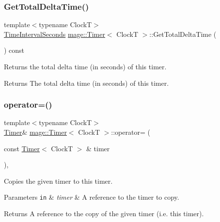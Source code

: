 \subsubsection{\texorpdfstring{Get\+Total\+Delta\+Time()}{GetTotalDeltaTime()}}
{\footnotesize\ttfamily template$<$typename ClockT$>$ \\
\mbox{\hyperlink{namespacemage_a21c3d1575018d1e0720948713c76be1f}{Time\+Interval\+Seconds}} \mbox{\hyperlink{classmage_1_1_timer}{mage\+::\+Timer}}$<$ ClockT $>$\+::Get\+Total\+Delta\+Time (\begin{DoxyParamCaption}{ }\end{DoxyParamCaption}) const\hspace{0.3cm}{\ttfamily [noexcept]}}

Returns the total delta time (in seconds) of this timer.

\begin{DoxyReturn}{Returns}
The total delta time (in seconds) of this timer. 
\end{DoxyReturn}
\mbox{\label{classmage_1_1_timer_a2a8aefb272e02d8ba4a26058df80f119}} 
\subsubsection{\texorpdfstring{operator=()}{operator=()}\hspace{0.1cm}{\footnotesize\ttfamily [1/2]}}
{\footnotesize\ttfamily template$<$typename ClockT$>$ \\
\mbox{\hyperlink{classmage_1_1_timer}{Timer}}\& \mbox{\hyperlink{classmage_1_1_timer}{mage\+::\+Timer}}$<$ ClockT $>$\+::operator= (\begin{DoxyParamCaption}\item[{const \mbox{\hyperlink{classmage_1_1_timer}{Timer}}$<$ ClockT $>$ \&}]{timer }\end{DoxyParamCaption})\hspace{0.3cm}{\ttfamily [default]}, {\ttfamily [noexcept]}}

Copies the given timer to this timer.


\begin{DoxyParams}[1]{Parameters}
\mbox{\tt in}  & {\em timer} & A reference to the timer to copy. \\
\hline
\end{DoxyParams}
\begin{DoxyReturn}{Returns}
A reference to the copy of the given timer (i.\+e. this timer). 
\end{DoxyReturn}
\mbox{\label{classmage_1_1_timer_a39654f81efccc38a4cbe6164659407dd}} 
